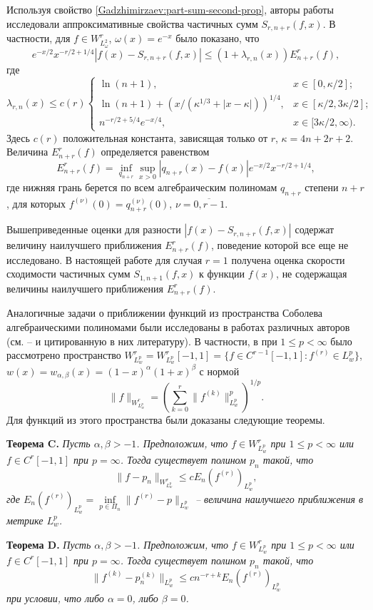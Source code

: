 Используя свойство \eqref{Gadzhimirzaev:part-sum-second-prop}, авторы работы \cite{Gadzhimirzaev:ShII-MMG} исследовали аппроксимативные свойства частичных сумм $S_{r,n+r}(f,x)$. В частности, для $f\in W^r_{L^2_\omega}$, $\omega(x)=e^{-x}$ было показано,
что~\cite[теорема 5.2]{Gadzhimirzaev:ShII-MMG}
$$
e^{-x/2}x^{-r/2+1/4}|f(x)-S_{r,n+r}(f,x)|\le (1+\lambda_{r,n}(x))E_{n+r}^r(f),
$$
где
$$
\lambda_{r,n}(x)\le c(r)
\begin{cases}
	\ln(n+1), & x\in[0,\kappa/2]; \\
	\ln(n+1)+(x/(\kappa^{1/3}+|x-\kappa|))^{1/4}, & x\in[\kappa/2,3\kappa/2]; \\
	n^{-r/2+5/4}e^{-x/4}, & x\in[3\kappa/2,\infty).
\end{cases}
$$
Здесь $c(r)$ положительная константа, зависящая только от $r$, $\kappa=4n+2r+2$.
Величина $E_{n+r}^r(f)$ определяется равенством
$$
E_{n+r}^r(f)=\inf_{q_{n+r}}\sup_{x>0}|q_{n+r}(x)-f(x)|e^{-x/2}x^{-r/2+1/4},
$$
где нижняя грань берется по всем алгебраическим полиномам $q_{n+r}$ степени $n+r$, для которых $f^{(\nu)}(0)=q_{n+r}^{(\nu)}(0)$, $\nu=\overline{0,r-1}$.

Вышеприведенные оценки для разности $|f(x)-S_{r,n+r}(f,x)|$ содержат величину наилучшего приближения $E_{n+r}^r(f)$, поведение которой все еще не исследовано. В настоящей работе для случая $r=1$ получена оценка скорости сходимости частичных сумм $S_{1,n+1}(f,x)$ к функции $f(x)$, не содержащая величины наилучшего приближения $E_{n+r}^r(f)$.

Аналогичные задачи о приближении функций из пространства Соболева алгебраическими полиномами были исследованы в работах различных авторов
(см. \cite{Approx-Xu}--\cite{Approx-Leonardo} и цитированную в них литературу). В частности, в \cite{Approx-Xu} при $1\le p<\infty$ было рассмотрено пространство $W^r_{L^p_w}=W^r_{L^p_w}[-1,1]=\{f\in C^{r-1}[-1,1]: f^{(r)}\in L^p_w\}$, $w(x)=w_{\alpha,\beta}(x)=(1-x)^\alpha(1+x)^\beta$ с нормой
$$
\|f\|_{W^r_{L^p_w}}=\left(\sum_{k=0}^{r}\|f^{(k)}\|^p_{L^p_w}\right)^{1/p}.
$$
Для функций из этого пространства были доказаны следующие теоремы.

\textbf{Теорема C.}
\textit{
Пусть $\alpha,\beta>-1$. Предположим, что $f\in W^r_{L^p_w}$ при $1\le p<\infty$ или $f\in C^r[-1,1]$ при $p=\infty$. Тогда существует полином $p_n$ такой, что
$$
\|f-p_n\|_{W^r_{L^p_w}}\le c E_n(f^{(r)})_{L^p_w},
$$
где $E_n(f^{(r)})_{L^p_w}=\inf\limits_{p\in\Pi_n}\|f^{(r)}-p\|_{L^p_w}$ -- величина наилучшего приближения в метрике $L^p_w$.
}

\textbf{Теорема D.}
\textit{
Пусть $\alpha,\beta>-1$. Предположим, что $f\in W^r_{L^p_w}$ при $1\le p<\infty$ или $f\in C^r[-1,1]$ при $p=\infty$. Тогда существует полином $p_n$ такой, что
$$
\|f^{(k)}-p_n^{(k)}\|_{L^p_w}\le c n^{-r+k}E_n(f^{(r)})_{L^p_w}
$$
при условии, что либо $\alpha=0$, либо $\beta=0$.
}

